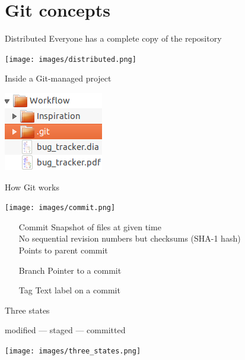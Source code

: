 \documentclass{beamer}
\begin{document}
\section{Git concepts}
\begin{frame}{Distributed}
  Everyone has a complete copy of the repository
  \begin{center}
    \texttt{[image: images/distributed.png]}
  \end{center}
\end{frame}

\begin{frame}{Inside a Git-managed project}
  \begin{center}
    \includegraphics{images/directory_structure.png}
  \end{center}
\end{frame}

\begin{frame}{How Git works}
  \begin{center}
    \texttt{[image: images/commit.png]}
  \end{center}
  \begin{itemize}
  \item[Commit] Snapshot of files at given time\\No sequential revision numbers but checksums (SHA-1 hash)\\Points to parent commit
  \item[Branch] Pointer to a commit
  \item[Tag] Text label on a commit
  \end{itemize}
\end{frame}

\begin{frame}{Three states}
  \begin{center}
    modified --- staged --- committed
  \end{center}
  \begin{center}
    \texttt{[image: images/three\_states.png]}
  \end{center}
\end{frame}
\end{document}
